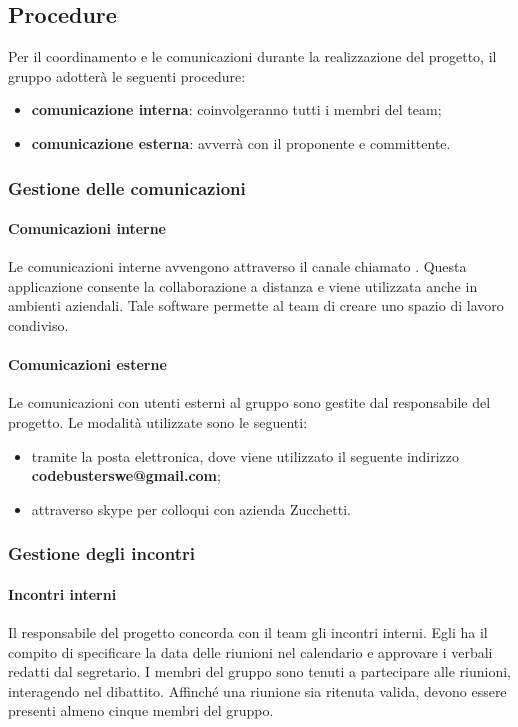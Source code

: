 \subsection{Procedure}
Per il coordinamento e le comunicazioni durante la realizzazione del progetto, il gruppo adotterà le seguenti procedure: 
\begin{itemize}
\item\textbf{comunicazione interna}: coinvolgeranno tutti i membri del team;
\item\textbf{comunicazione esterna}: avverrà con il proponente e committente.
\end{itemize}

\subsubsection{Gestione delle comunicazioni}
\paragraph{Comunicazioni interne}
Le comunicazioni interne avvengono attraverso il canale chiamato . Questa applicazione consente la collaborazione a distanza e viene utilizzata anche in ambienti aziendali. Tale software permette al team di creare uno spazio di lavoro condiviso.

\paragraph{Comunicazioni esterne}
Le comunicazioni con utenti esterni al gruppo sono gestite dal responsabile del progetto. Le modalità utilizzate sono le seguenti: 
\begin{itemize}
\item tramite la posta elettronica, dove viene utilizzato il seguente indirizzo \textbf{codebusterswe@gmail.com}; 
\item attraverso skype per colloqui con azienda Zucchetti.
\end{itemize}

\subsubsection{Gestione degli incontri}
\paragraph{Incontri interni} 
Il responsabile del progetto concorda con il team gli incontri interni. Egli ha il compito di specificare la data delle riunioni nel calendario e approvare i verbali redatti dal segretario. I membri del gruppo sono tenuti a partecipare alle riunioni, interagendo nel dibattito. Affinché una riunione sia ritenuta valida, devono essere presenti almeno cinque membri del gruppo.

